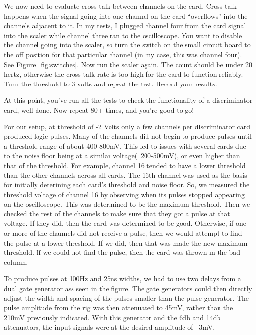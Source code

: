 \documentclass[final]{report}
\begin{document}
We now need to evaluate cross talk between channels on the card. Cross talk happens when the signal going into one channel on the card ``overflows'' into the channels adjacent to it. In my tests, I plugged channel four from the card signal into the scaler while channel three ran to the oscilloscope. You want to disable the channel going into the scaler, so turn the switch on the small circuit board to the off position for that particular channel (in my case, this was channel four). See Figure~\ref{fig:switches}. Now run the scaler again. The count should be under 20 hertz, otherwise the cross talk rate is too high for the card to function reliably. Turn the threshold to 3 volts and repeat the test. Record your results.

At this point, you've run all the tests to check the functionality of a discriminator card, well done. Now repeat 80+ times, and you're good to go!



For our setup, at threshold of -2 Volts only a few channels per discriminator card  produced logic pulses. Many of the channels did not begin to produce pulses until a threshold range of about 400-800mV. This led to issues with several cards due to the noise floor being at a similar voltage(~200-500mV), or even higher than that of the threshold. For example, channel 16 tended to have a lower threshold than the other channels across all cards. The 16th channel was used as the basis for initially deterining each card's threshold and noise floor. So, we measured the threshold voltage of channel 16 by observing when its pulses stopped appearing on the oscilloscope. This was determined to be the maximum threshold. Then we checked the rest of the channels to make sure that they got a pulse at that voltage. If they did, then the card was determined to be good. Otherwise, if one or more of the channels did not receive a pulse, then we would attempt to find the pulse at a lower threshold. If we did, then that was made the new maximum threshold. If we could not find the pulse, then the card was thrown in the bad column. 


To produce pulses at 100Hz and 25ns widths, we had to use two delays from a dual gate generator ass seen in the figure. The gate generators could then directly adjust the width and spacing of the pulses smaller than the pulse generator. The pulse amplitude from the rig was then attenuated to 45mV, rather than the 210mV previously indicated. With this generator and the 6db and 14db attenuators, the input signals were at the desired amplitude of ~3mV.
\end{document}
